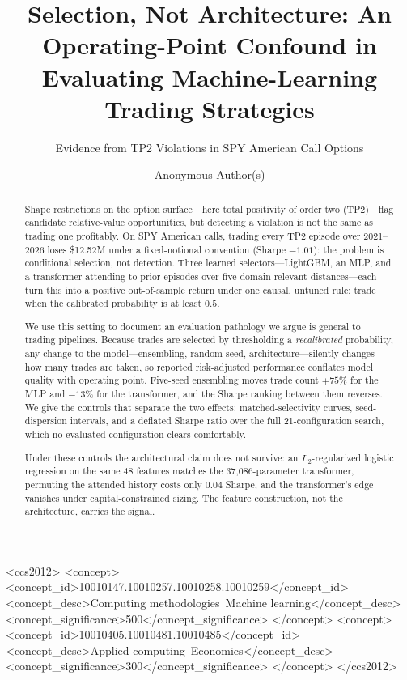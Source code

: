 \documentclass[sigconf,review,anonymous]{acmart}
\begin{document}
\title{Selection, Not Architecture: An Operating-Point Confound in Evaluating Machine-Learning Trading Strategies}
\subtitle{Evidence from TP2 Violations in SPY American Call Options}

\author{Anonymous Author(s)}

\renewcommand{\shortauthors}{Anonymous et al.}

\begin{abstract}
Shape restrictions on the option surface---here total positivity of order two (TP2)---flag candidate relative-value opportunities, but detecting a violation is not the same as trading one profitably. On SPY American calls, trading every TP2 episode over 2021--2026 loses \$12.52M under a fixed-notional convention (Sharpe $-1.01$): the problem is conditional selection, not detection. Three learned selectors---LightGBM, an MLP, and a transformer attending to prior episodes over five domain-relevant distances---each turn this into a positive out-of-sample return under one causal, untuned rule: trade when the calibrated probability is at least $0.5$.

We use this setting to document an evaluation pathology we argue is general to trading pipelines. Because trades are selected by thresholding a \emph{recalibrated} probability, any change to the model---ensembling, random seed, architecture---silently changes how many trades are taken, so reported risk-adjusted performance conflates model quality with operating point. Five-seed ensembling moves trade count $+75\%$ for the MLP and $-13\%$ for the transformer, and the Sharpe ranking between them reverses. We give the controls that separate the two effects: matched-selectivity curves, seed-dispersion intervals, and a deflated Sharpe ratio over the full 21-configuration search, which no evaluated configuration clears comfortably.

Under these controls the architectural claim does not survive: an $L_2$-regularized logistic regression on the same 48 features matches the 37{,}086-parameter transformer, permuting the attended history costs only 0.04 Sharpe, and the transformer's edge vanishes under capital-constrained sizing. The feature construction, not the architecture, carries the signal.
\end{abstract}

\begin{CCSXML}
<ccs2012>
 <concept>
  <concept_id>10010147.10010257.10010258.10010259</concept_id>
  <concept_desc>Computing methodologies~Machine learning</concept_desc>
  <concept_significance>500</concept_significance>
 </concept>
 <concept>
  <concept_id>10010405.10010481.10010485</concept_id>
  <concept_desc>Applied computing~Economics</concept_desc>
  <concept_significance>300</concept_significance>
 </concept>
</ccs2012>
\end{CCSXML}
\end{document}
